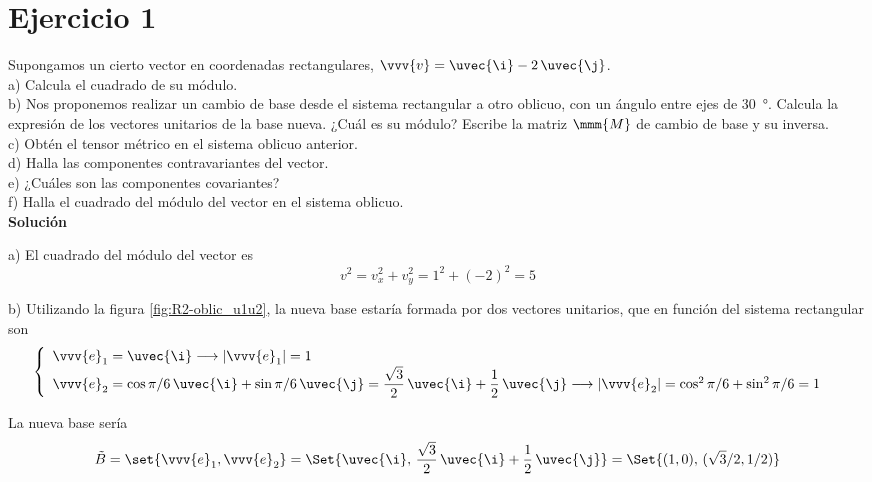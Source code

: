 %

\section{Ejercicio 1}
\noindent
Supongamos un cierto vector en coordenadas rectangulares,
$\vvv{v} = \uvec{\i} - 2\,\uvec{\j}$.\\
a) Calcula el cuadrado de su módulo.\\
b) Nos proponemos realizar un cambio de base desde el sistema rectangular a otro oblicuo,
con un ángulo entre ejes de \qty{30}{\degree}. Calcula la expresión de los vectores
unitarios de la base nueva. ¿Cuál es su módulo?
Escribe la matriz $\mmm{M}$ de cambio de base y su inversa.\\
c) Obtén el tensor métrico en el sistema oblicuo anterior.\\
d) Halla las componentes contravariantes del vector.\\
e) ¿Cuáles son las componentes covariantes?\\
f) Halla el cuadrado del módulo del vector en el sistema oblicuo.\\

\noindent
\textbf{Solución}

\noindent
a) El cuadrado del módulo del vector es
\[
  v^2 = v_x^2 + v_y^2 = 1^2 + (-2)^2 = 5
\]

\noindent
b) Utilizando la figura \ref{fig:R2-oblic_u1u2}, la nueva base estaría formada
por dos vectores unitarios, que en función del sistema rectangular son
\[
  \begin{cases}
    \begin{array}{l}
      \vvv{e}_1 = \uvec{\i}
      \longrightarrow |\vvv{e}_1| = 1\\ 
      \vvv{e}_2 = \cos\pi/6\,\uvec{\i} + \sin\pi/6\,\uvec{\j}
      = \dfrac{\sqrt{3}}{2}\,\uvec{\i} + \dfrac{1}{2}\,\uvec{\j}
      \longrightarrow |\vvv{e}_2| = \cos^2\pi/6 + \sin^2\pi/6 = 1
    \end{array}
  \end{cases}
\]

La nueva base sería
\[
  \tilde{B} = \set{\vvv{e}_1, \vvv{e}_2}
  = \Set{\uvec{\i},\, \dfrac{\sqrt{3}}{2}\,\uvec{\i} + \dfrac{1}{2}\,\uvec{\j}}
  = \Set{(1,0),\, (\sqrt{3}/2, 1/2)}
\]

